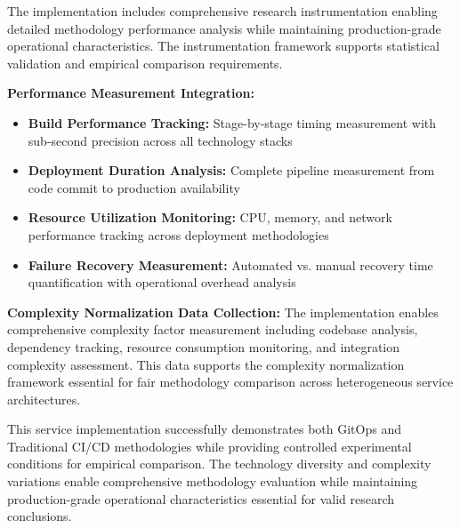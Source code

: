 The implementation includes comprehensive research instrumentation enabling detailed methodology performance analysis while maintaining production-grade operational characteristics. The instrumentation framework supports statistical validation and empirical comparison requirements.

\textbf{Performance Measurement Integration:}
\begin{itemize}
\item \textbf{Build Performance Tracking:} Stage-by-stage timing measurement with sub-second precision across all technology stacks
\item \textbf{Deployment Duration Analysis:} Complete pipeline measurement from code commit to production availability
\item \textbf{Resource Utilization Monitoring:} CPU, memory, and network performance tracking across deployment methodologies
\item \textbf{Failure Recovery Measurement:} Automated vs. manual recovery time quantification with operational overhead analysis
\end{itemize}

\textbf{Complexity Normalization Data Collection:}
The implementation enables comprehensive complexity factor measurement including codebase analysis, dependency tracking, resource consumption monitoring, and integration complexity assessment. This data supports the complexity normalization framework essential for fair methodology comparison across heterogeneous service architectures.

This service implementation successfully demonstrates both GitOps and Traditional CI/CD methodologies while providing controlled experimental conditions for empirical comparison. The technology diversity and complexity variations enable comprehensive methodology evaluation while maintaining production-grade operational characteristics essential for valid research conclusions.